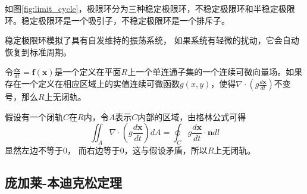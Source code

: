 如图\ref{fig:limit_cycle}，极限环分为三种稳定极限环，不稳定极限环和半稳定极限环。稳定极限环是一个吸引子，不稳定极限环是一个排斥子。

稳定极限环模拟了具有自发维持的振荡系统， 如果系统有轻微的扰动，它会自动恢复到标准周期。

\begin{thm}[Dulac准则]
    令$\frac{d\mathbf{x}}{dt}=\mathbf{f}(\mathbf{x})$是一个定义在平面$R$上一个单连通子集的一个连续可微向量场。如果存在一个定义在相应区域上的实值连续可微函数$g(x, y)$，使得$\nabla \cdot (g \frac{d\mathbf{x}}{dt})$不变号，那么$R$上无闭轨。
\end{thm}
\begin{pf}
    假设有一个闭轨$C$在$R$内，令$A$表示$C$内部的区域，由格林公式可得
    \begin{equation}
        \iint_A \nabla \cdot(g \frac{d\mathbf{x}}{dt})dA=\oint_C g \frac{d\mathbf{x}}{dt}\cdot \mathbf{n}dl
    \end{equation}
    显然左边不等于0， 而右边等于0，这与假设矛盾，所以$R$上无闭轨。
\end{pf}

\subsection{庞加莱-本迪克松定理}

